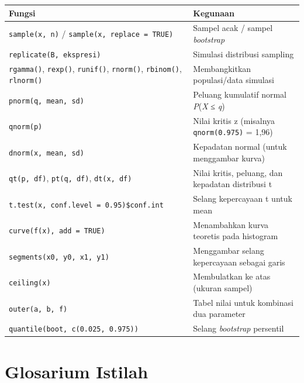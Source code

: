 \documentclass[
  indonesian,
  letterpaper,
]{book}
\newcounter{none} %
\begin{document}
{\def\LTcaptype{none} %
\begin{longtable}[]{@{}
  >{\raggedright\arraybackslash}p{}
  >{\raggedright\arraybackslash}p{}@{}}
\toprule\noalign{}
\begin{minipage}[b]{\linewidth}\raggedright
Fungsi
\end{minipage} & \begin{minipage}[b]{\linewidth}\raggedright
Kegunaan
\end{minipage} \\
\midrule\noalign{}
\endhead
\bottomrule\noalign{}
\endlastfoot
\texttt{sample(x,\ n)} / \texttt{sample(x,\ replace\ =\ TRUE)} & Sampel
acak / sampel \emph{bootstrap} \\
\texttt{replicate(B,\ ekspresi)} & Simulasi distribusi sampling \\
\texttt{rgamma()}, \texttt{rexp()}, \texttt{runif()}, \texttt{rnorm()},
\texttt{rbinom()}, \texttt{rlnorm()} & Membangkitkan populasi/data
simulasi \\
\texttt{pnorm(q,\ mean,\ sd)} & Peluang kumulatif normal
\emph{P}(\emph{X} ≤ \emph{q}) \\
\texttt{qnorm(p)} & Nilai kritis z (misalnya \texttt{qnorm(0.975)} =
1,96) \\
\texttt{dnorm(x,\ mean,\ sd)} & Kepadatan normal (untuk menggambar
kurva) \\
\texttt{qt(p,\ df)}, \texttt{pt(q,\ df)}, \texttt{dt(x,\ df)} & Nilai
kritis, peluang, dan kepadatan distribusi t \\
\texttt{t.test(x,\ conf.level\ =\ 0.95)\$conf.int} & Selang kepercayaan
t untuk mean \\
\texttt{curve(f(x),\ add\ =\ TRUE)} & Menambahkan kurva teoretis pada
histogram \\
\texttt{segments(x0,\ y0,\ x1,\ y1)} & Menggambar selang kepercayaan
sebagai garis \\
\texttt{ceiling(x)} & Membulatkan ke atas (ukuran sampel) \\
\texttt{outer(a,\ b,\ f)} & Tabel nilai untuk kombinasi dua parameter \\
\texttt{quantile(boot,\ c(0.025,\ 0.975))} & Selang \emph{bootstrap}
persentil \\
\end{longtable}
}

\section{Glosarium Istilah}\label{glosarium-istilah}
\end{document}
